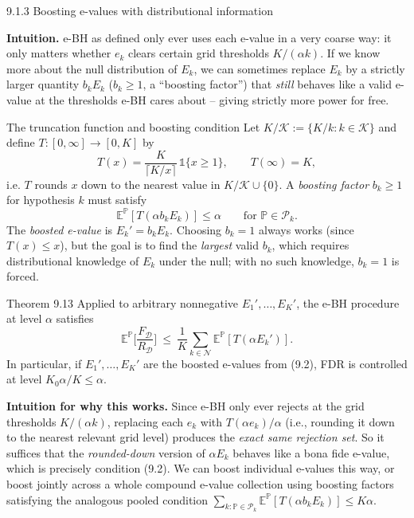 \documentclass[aspectratio=169,10pt]{beamer}
\newcommand{\Kc}{\mathcal{K}}
\newcommand{\Nc}{\mathcal{N}}
\begin{document}
\begin{frame}[allowframebreaks]{9.1.3 Boosting e-values with distributional information}

\textbf{Intuition.} e-BH as defined only ever uses each e-value in a very coarse way: it only matters whether $e_k$ clears certain grid thresholds $K/(\alpha k)$. If we know more about the null distribution of $E_k$, we can sometimes replace $E_k$ by a strictly larger quantity $b_k E_k$ ($b_k \ge 1$, a ``boosting factor'') that \emph{still} behaves like a valid e-value at the thresholds e-BH cares about -- giving strictly more power for free.

\begin{block}{The truncation function and boosting condition}
Let $K/\Kc := \{K/k : k \in \Kc\}$ and define $T:[0,\infty]\to[0,K]$ by
\[
T(x) = \frac{K}{\lceil K/x \rceil}\, \mathbb{1}\{x \ge 1\}, \qquad T(\infty)=K,
\]
i.e. $T$ rounds $x$ down to the nearest value in $K/\Kc \cup \{0\}$. A \emph{boosting factor} $b_k \ge 1$ for hypothesis $k$ must satisfy
\[
\mathbb{E}^{\mathbb{P}}[T(\alpha b_k E_k)] \le \alpha \qquad \text{for } \mathbb{P}\in\mathcal{P}_k. \tag{9.2}
\]
The \emph{boosted e-value} is $E_k' = b_k E_k$. Choosing $b_k=1$ always works (since $T(x)\le x$), but the goal is to find the \emph{largest} valid $b_k$, which requires distributional knowledge of $E_k$ under the null; with no such knowledge, $b_k=1$ is forced.
\end{block}

\framebreak

\begin{block}{Theorem 9.13}
Applied to arbitrary nonnegative $E_1',\dots,E_K'$, the e-BH procedure at level $\alpha$ satisfies
\[
\mathbb{E}^{\mathbb{P}}\Big[\frac{F_\mathcal{D}}{R_\mathcal{D}}\Big] \ \le\ \frac{1}{K}\sum_{k\in\Nc}\mathbb{E}^{\mathbb{P}}[T(\alpha E_k')].
\]
In particular, if $E_1',\dots,E_K'$ are the boosted e-values from (9.2), FDR is controlled at level $K_0\alpha/K \le \alpha$.
\end{block}

\textbf{Intuition for why this works.} Since e-BH only ever rejects at the grid thresholds $K/(\alpha k)$, replacing each $e_k$ with $T(\alpha e_k)/\alpha$ (i.e., rounding it down to the nearest relevant grid level) produces the \emph{exact same rejection set}. So it suffices that the \emph{rounded-down} version of $\alpha E_k$ behaves like a bona fide e-value, which is precisely condition (9.2). We can boost individual e-values this way, or boost jointly across a whole compound e-value collection using boosting factors satisfying the analogous pooled condition $\sum_{k:\mathbb{P}\in\mathcal{P}_k}\mathbb{E}^{\mathbb{P}}[T(\alpha b_k E_k)] \le K\alpha$.

\end{frame}
\end{document}
